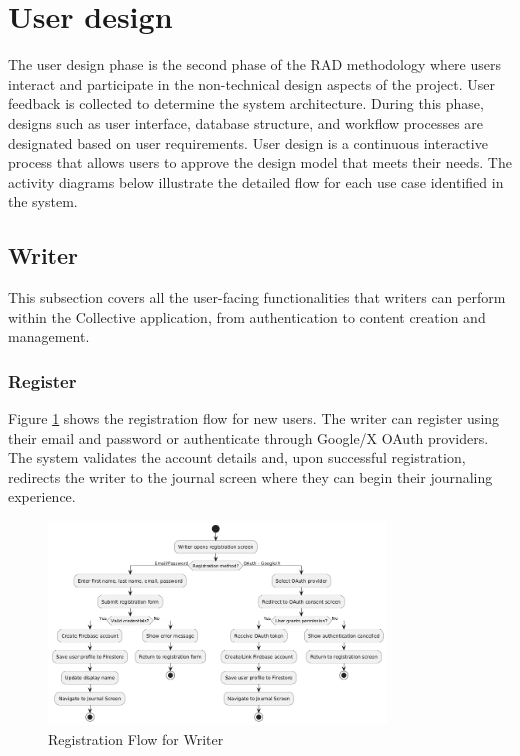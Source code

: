\section{User design}\label{sec:userDesign}

The user design phase is the second phase of the RAD methodology where users interact and participate in the non-technical design aspects of the project. User feedback is collected to determine the system architecture. During this phase, designs such as user interface, database structure, and workflow processes are designated based on user requirements. User design is a continuous interactive process that allows users to approve the design model that meets their needs. The activity diagrams below illustrate the detailed flow for each use case identified in the system.

\subsection{Writer}\label{subsec:writer}

This subsection covers all the user-facing functionalities that writers can perform within the Collective application, from authentication to content creation and management.

\subsubsection{Register}\label{subsubsec:register}

Figure \ref{fig:register-flow} shows the registration flow for new users. The writer can register using their email and password or authenticate through Google/X OAuth providers. The system validates the account details and, upon successful registration, redirects the writer to the journal screen where they can begin their journaling experience.

\begin{figure}[H]
\centering
\includegraphics[width=0.8\textwidth]{files/imgs/register_flow.png}
\caption{Registration Flow for Writer}
\label{fig:register-flow}
\end{figure}

